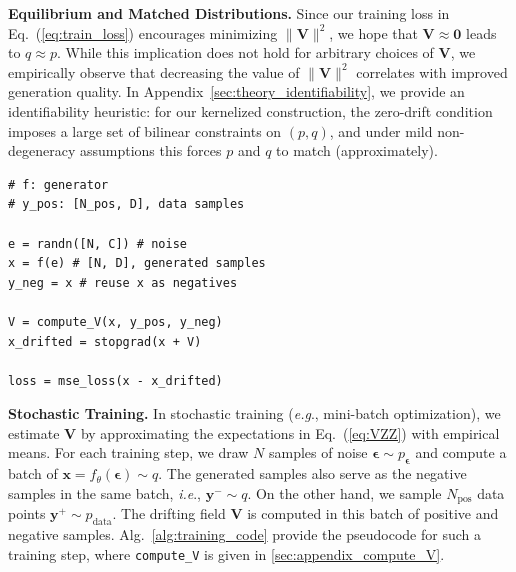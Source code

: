 \documentclass{article}
\newcommand{\vv}[1]{\mathbf{#1}}
\newcommand{\x}{\vv{x}}
\newcommand{\y}{\vv{y}}
\newcommand{\V}{\vv{V}}
\newcommand{\e}{{\boldsymbol{\epsilon}}}
\renewcommand{\paragraph}[1]{\vspace{.05em}\noindent\textbf{#1}}
\def\onedot{.}
\def\eg{\emph{e.g}\onedot} \def\Eg{\emph{E.g}\onedot}
\def\ie{\emph{i.e}\onedot} \def\Ie{\emph{I.e}\onedot}
\theoremstyle{plain}
\theoremstyle{definition}
\theoremstyle{remark}
\begin{document}
\paragraph{Equilibrium and Matched Distributions.}
Since our training loss in Eq.~(\ref{eq:train_loss}) encourages minimizing $\|\V\|^2$, we hope that $\V \approx \textbf{0}$ leads to $q\approx p$.
While this implication does not hold for arbitrary choices of $\V$, we empirically observe that decreasing the value of $\|\V\|^2$ correlates with improved generation quality. In Appendix~\ref{sec:theory_identifiability}, we provide an identifiability heuristic: for our kernelized construction, the zero-drift condition imposes a large set of bilinear constraints on $(p,q)$, and under mild non-degeneracy assumptions this forces $p$ and $q$ to match (approximately).


%

\begin{algorithm}[t]
\caption{
\textbf{Training Loss.} Note: for brevity, here the negative samples $\texttt{y\_neg}$ are from the same batch of generated data, though they can include other source of negatives.
}
\label{alg:training_code}
\begin{lstlisting}
# f: generator
# y_pos: [N_pos, D], data samples

e = randn([N, C]) # noise
x = f(e) # [N, D], generated samples
y_neg = x # reuse x as negatives

V = compute_V(x, y_pos, y_neg)
x_drifted = stopgrad(x + V)

loss = mse_loss(x - x_drifted)
\end{lstlisting}
\end{algorithm}

\paragraph{Stochastic Training.}
In stochastic training (\eg, mini-batch optimization), we estimate $\V$ by approximating the expectations in Eq.~(\ref{eq:VZZ}) with empirical means.
For each training step, we draw $N$ samples of noise $\e \sim
p_\e$ and compute a batch of $\x=f_\theta(\e)\sim q$.
The generated samples also serve as the negative samples in the same batch, \ie, $\y^- \sim q$.
On the other hand, we sample $N_\text{pos}$ data points $\y^+ \sim p_\text{data}$. The drifting field $\V$ is computed in this batch of positive and negative samples.
Alg.~\ref{alg:training_code} provide the pseudocode for such a training step, where \texttt{compute\_V} is given in \cref{sec:appendix_compute_V}.
\end{document}
